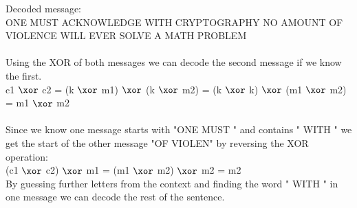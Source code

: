 Decoded message: \\
ONE MUST ACKNOWLEDGE WITH CRYPTOGRAPHY NO AMOUNT OF VIOLENCE WILL EVER SOLVE A MATH PROBLEM \\
\\
Using the XOR of both messages we can decode the second message if we know the first. \\
c1  \(\xor\) c2 = (k  \(\xor\) m1)  \(\xor\) (k  \(\xor\) m2) =  (k  \(\xor\) k)  \(\xor\) (m1  \(\xor\) m2) = m1  \(\xor\) m2  \\
\\
Since we know one message starts with "ONE MUST " and contains " WITH " we get the start of the other message "OF VIOLEN" by reversing the XOR operation: \\
(c1  \(\xor\) c2)    \(\xor\) m1 =  (m1  \(\xor\) m2)  \(\xor\) m2 = m2 \\
By guessing further letters from the context and finding the word " WITH " in one message we can decode the rest of the sentence. \\

